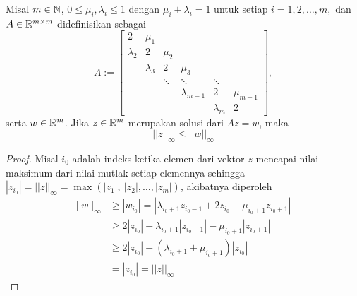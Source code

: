 \begin{lemma}\label{3.2.1}
    Misal $m \in \mathbb{N}$, $0 \leq \mu_i, \lambda_i \leq 1$ dengan $\mu_i + \lambda_i = 1$ untuk setiap $i=1,2,\dots,m,$ dan $A \in \mathbb{R}^{m \times m}$ didefinisikan sebagai
    \begin{equation*}
        A:=
        \begin{bmatrix}
            2 & \mu_1 \\
            \lambda_2 & 2 & \mu_2 \\
            & \lambda_3 & 2 & \mu_3 \\
            && \ddots & \ddots & \ddots \\
            &&&\lambda_{m-1} & 2 & \mu_{m-1} \\
            &&&&\lambda_{m} & 2
        \end{bmatrix},
    \end{equation*}
    serta $w \in \mathbb{R}^m$. Jika $z \in \mathbb{R}^m$ merupakan solusi dari $Az = w$, maka
    $$||z||_\infty \leq ||w||_\infty$$
\end{lemma}
\begin{proof}
    Misal $i_0$ adalah indeks ketika elemen dari vektor $z$ mencapai nilai maksimum dari nilai mutlak setiap elemennya sehingga $|z_{i_0}| = ||z||_\infty=\max(|z_1|,~|z_2|,\dots,|z_m|)$, akibatnya diperoleh
    \begin{align*}
        ||w||_\infty &\geq |w_{i_0}| = |\lambda_{i_0+1}z_{i_0-1} + 2z_{i_0} + \mu_{i_0+1}z_{i_0+1}|\\
        &\geq 2|z_{i_0}| - \lambda_{i_0+1}|z_{i_0-1}| - \mu_{i_0+1}|z_{i_0+1}|\\
        &\geq 2|z_{i_0}| - (\lambda_{i_0+1} + \mu_{i_0+1})|z_{i_0}|\\
        &=|z_{i_0}|=||z||_\infty
    \end{align*}
\end{proof}

